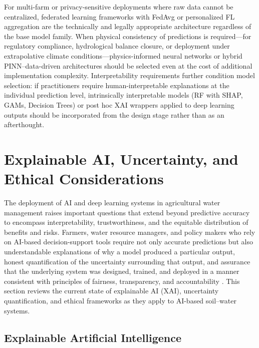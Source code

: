 \documentclass[land,review,accept,pdftex,oneauthor]{Definitions/mdpi}
\begin{document}
{For multi-farm or privacy-sensitive deployments where raw data cannot be centralized, federated learning frameworks with FedAvg or personalized FL aggregation are the technically and legally appropriate architecture regardless of the base model family. When physical consistency of predictions is required---for regulatory compliance, hydrological balance closure, or deployment under extrapolative climate conditions---physics-informed neural networks or hybrid PINN--data-driven architectures should be selected even at the cost of additional implementation complexity. Interpretability requirements further condition model selection: if practitioners require human-interpretable explanations at the individual prediction level, intrinsically interpretable models (RF with SHAP, GAMs, Decision Trees) or post hoc XAI wrappers applied to deep learning outputs should be incorporated from the design stage rather than as an afterthought.}


\section{{Explainable AI, Uncertainty, and Ethical Considerations}}\label{sec7}

The deployment of AI and deep learning systems in agricultural water management raises important questions that extend beyond predictive accuracy to encompass interpretability, trustworthiness, and the equitable distribution of benefits and risks. Farmers, water resource managers, and policy makers who rely on AI-based decision-support tools require not only accurate predictions but also understandable explanations of why a model produced a particular output, honest quantification of the uncertainty surrounding that output, and assurance that the underlying system was designed, trained, and deployed in a manner consistent with principles of fairness, transparency, and accountability \citep{adadi2018peeking}. This section reviews the current state of explainable AI (XAI), uncertainty quantification, and ethical frameworks as they apply to AI-based soil--water systems.

\subsection{Explainable Artificial Intelligence}
\end{document}
